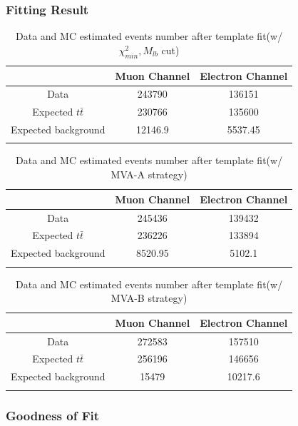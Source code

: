 		\subsubsection{Fitting Result}
		\label{sssec:FittingResult}

		\begin{center}
		\begin{longtable}[H]{ c c c }
		\caption{Data and MC estimated events number after template fit(w/ $\chi^2_{min}, M_{lb}$ cut)} \\
		\hline
		 & Muon Channel & Electron Channel \\ 
		\hline
		 Data & 243790 & 136151 \\
		\hline
		 Expected $t\bar{t}$ & 230766 & 135600 \\
		 Expected background & 12146.9 & 5537.45 \\
		\hline
		\label{BkgEst:tb:DataMC_est_chi2}
		\end{longtable}
		\end{center}
		\FloatBarrier

		\begin{center}
		\begin{longtable}[H]{ c c c }
		\caption{Data and MC estimated events number after template fit(w/ MVA-A strategy)} \\
		\hline
		 & Muon Channel & Electron Channel \\ 
		\hline
		 Data & 245436 & 139432 \\
		\hline
		 Expected $t\bar{t}$ & 236226 & 133894  \\
		 Expected background & 8520.95 & 5102.1 \\
		\hline
		\label{BkgEst:tb:DataMC_est_MVAA}
		\end{longtable}
		\end{center}
		\FloatBarrier

		\begin{center}
		\begin{longtable}[H]{ c c c }
		\caption{Data and MC estimated events number after template fit(w/ MVA-B strategy)} \\
		\hline
		 & Muon Channel & Electron Channel \\ 
		\hline
		 Data & 272583 & 157510 \\
		\hline
		 Expected $t\bar{t}$ & 256196 & 146656 \\
		 Expected background & 15479 & 10217.6 \\
		\hline
		\label{BkgEst:tb:DataMC_est_MVAB}
		\end{longtable}
		\end{center}
		\FloatBarrier

		\subsubsection{Goodness of Fit}
		\label{sssec:GoF}

	





\FloatBarrier
